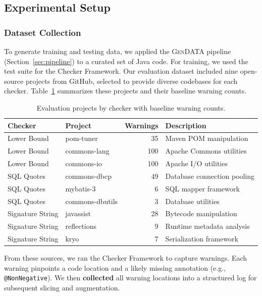 \documentclass[acmsmall,screen,review,anonymous]{acmart}
\makeatletter
\newcommand{\gendata}{\textsc{GenDATA}\xspace}
\newcommand{\cf}{Checker Framework\xspace}
\newcommand{\atmark}[1]{\texttt{@#1}}
\makeatother
\begin{document}
\subsection{Experimental Setup}
\label{sec:setup}

\subsubsection{Dataset Collection}
\label{sec:dataset}

To generate training and testing data, we applied the \gendata pipeline (Section~\ref{sec:pipeline}) to a curated set of Java code. For training, we used the test suite for the \cf. Our evaluation dataset included nine open-source projects from GitHub, selected to provide diverse codebases for each checker. Table~\ref{tab:evalprojects} summarizes these projects and their baseline warning counts.

\begin{table}[t]
\caption{Evaluation projects by checker with baseline warning counts.}
\label{tab:evalprojects}
\begin{tabular}{llrl}
\toprule
\textbf{Checker} & \textbf{Project} & \textbf{Warnings} & \textbf{Description} \\
\midrule
Lower Bound & pom-tuner & 35 & Maven POM manipulation \\
Lower Bound & commons-lang & 100 & Apache Commons utilities \\
Lower Bound & commons-io & 100 & Apache I/O utilities \\
\midrule
SQL Quotes & commons-dbcp & 49 & Database connection pooling \\
SQL Quotes & mybatis-3 & 6 & SQL mapper framework \\
SQL Quotes & commons-dbutils & 3 & Database utilities \\
\midrule
Signature String & javassist & 28 & Bytecode manipulation \\
Signature String & reflections & 9 & Runtime metadata analysis \\
Signature String & kryo & 7 & Serialization framework \\
\bottomrule
\end{tabular}
\end{table}

From these sources, we ran the \cf to capture warnings. Each warning pinpoints a code location and a likely missing annotation (e.g., \atmark{NonNegative}). We then \textbf{collected} all warning locations into a structured log for subsequent slicing and augmentation.
\end{document}
